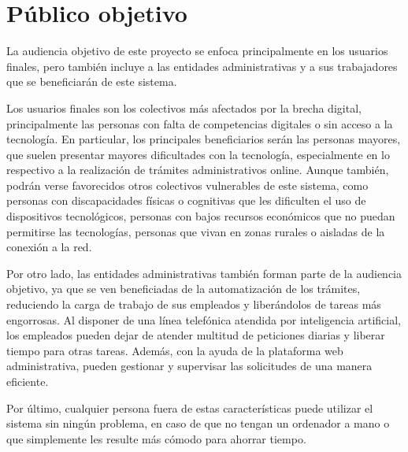 \section{Público objetivo}
    La audiencia objetivo de este proyecto se enfoca principalmente en los usuarios finales, pero también incluye a las entidades administrativas y a sus trabajadores que se beneficiarán de este sistema.

    Los usuarios finales son los colectivos más afectados por la brecha digital, principalmente las personas con falta de competencias digitales o sin acceso a la tecnología.
    En particular, los principales beneficiarios serán las personas mayores, que suelen presentar mayores dificultades con la tecnología, especialmente en lo respectivo a la realización de trámites administrativos online.
    Aunque también, podrán verse favorecidos otros colectivos vulnerables de este sistema, como personas con discapacidades físicas o cognitivas que les dificulten el uso de dispositivos tecnológicos, personas con bajos recursos económicos que no puedan permitirse las tecnologías, personas que vivan en zonas rurales o aisladas de la conexión a la red.
        
    Por otro lado, las entidades administrativas también forman parte de la audiencia objetivo, ya que se ven beneficiadas de la automatización de los trámites, reduciendo la carga de trabajo de sus empleados y liberándolos de tareas más engorrosas. 
    Al disponer de una línea telefónica atendida por inteligencia artificial, los empleados pueden dejar de atender multitud de peticiones diarias y liberar tiempo para otras tareas. Además, con la ayuda de la plataforma web administrativa, pueden gestionar y supervisar las solicitudes de una manera eficiente.
        
    Por último, cualquier persona fuera de estas características puede utilizar el sistema sin ningún problema, en caso de que no tengan un ordenador a mano o que simplemente les resulte más cómodo para ahorrar tiempo.
        
